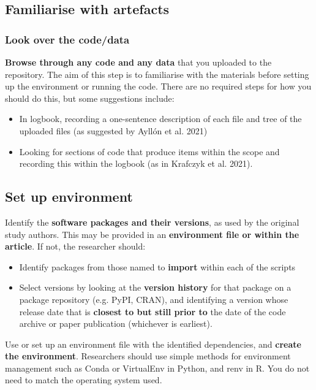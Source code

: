 \vspace{0.5cm}
\subsection{Familiarise with artefacts}

\subsubsection{Look over the code/data}

\textbf{Browse through any code and any data} that you uploaded to the repository. The aim of this step is to familiarise with the materials before setting up the environment or running the code. There are no required steps for how you should do this, but some suggestions include:
\begin{itemize}
    \item In logbook, recording a one-sentence description of each file and tree of the uploaded files (as suggested by Ayllón et al. 2021\autocite{ayllon_keeping_2021})
    \item Looking for sections of code that produce items within the scope and recording this within the logbook (as in Krafczyk et al. 2021\cite{krafczyk_learning_2021}).
\end{itemize}

\newpage
\subsection{Set up environment}

Identify the \textbf{software packages and their versions}, as used by the original study authors. This may be provided in an \textbf{environment file or within the article}. If not, the researcher should:
\begin{itemize}
    \item Identify packages from those named to \textbf{import} within each of the scripts
    \item Select versions by looking at the \textbf{version history} for that package on a package repository (e.g. PyPI, CRAN), and identifying a version whose release date that is \textbf{closest to but still prior to} the date of the code archive or paper publication (whichever is earliest).
\end{itemize}

Use or set up an environment file with the identified dependencies, and \textbf{create the environment}. Researchers should use simple methods for environment management such as Conda or VirtualEnv in Python, and renv in R. You do not need to match the operating system used.

